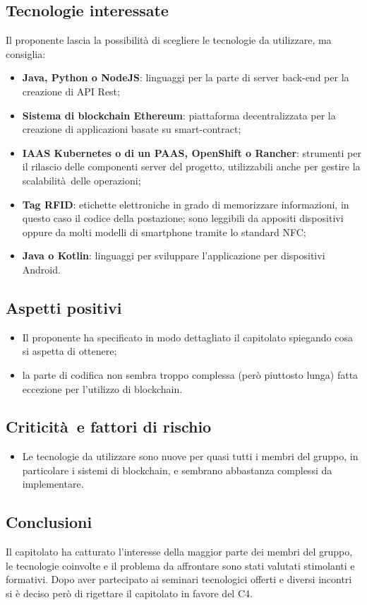 \subsection{Tecnologie interessate}
Il proponente lascia la possibilità di scegliere le tecnologie da utilizzare, ma consiglia:
\begin{itemize}
    \item \textbf{Java, Python o NodeJS}: linguaggi per la parte di server back-end per la creazione di API Rest;
    \item \textbf{Sistema di blockchain Ethereum}: piattaforma decentralizzata per la creazione di applicazioni basate su smart-contract;
    \item \textbf{IAAS Kubernetes o di un PAAS, OpenShift o Rancher}: strumenti per il rilascio delle componenti server del progetto, utilizzabili anche per gestire la scalabilità delle operazioni;
    \item \textbf{Tag RFID}: etichette elettroniche in grado di memorizzare informazioni, in questo caso il codice della postazione; sono leggibili da appositi dispositivi oppure da molti modelli di smartphone tramite lo standard NFC;
    \item \textbf{Java o Kotlin}: linguaggi per sviluppare l'applicazione per dispositivi Android.
\end{itemize}
\subsection{Aspetti positivi}
\begin{itemize}
    \item Il proponente ha specificato in modo dettagliato il capitolato spiegando cosa si aspetta di ottenere;
    \item la parte di codifica non sembra troppo complessa (però piuttosto lunga) fatta eccezione per l'utilizzo di blockchain.
\end{itemize}
\subsection{Criticità e fattori di rischio}
\begin{itemize}
    \item Le tecnologie da utilizzare sono nuove per quasi tutti i membri del gruppo, in particolare i sistemi di blockchain, e sembrano abbastanza complessi da implementare.
\end{itemize}
\subsection{Conclusioni}
Il capitolato ha catturato l'interesse della maggior parte dei membri del gruppo, le tecnologie coinvolte e il problema da affrontare sono stati valutati stimolanti e formativi.
Dopo aver partecipato ai seminari tecnologici offerti e diversi incontri si è deciso però di rigettare il capitolato in favore del C4.
